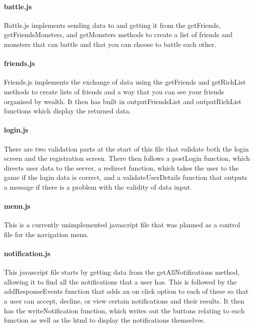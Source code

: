 \documentclass{project}
\begin{document}
\paragraph{battle.js}
Battle.js implements sending data to and getting it from the getFriends, getFriendsMonsters, and getMonsters methods to create a list of friends and monsters that can battle and that you can choose to battle each other.

\paragraph{friends.js}
Friends.js implements the exchange of data using the getFriends and getRichList methods to create lists of friends and a way that you can see your friends organised by wealth. It then has built in outputFriendsList and outputRichList functions which display the returned data.

\paragraph{login.js}
There are two validation parts at the start of this file that validate both the login screen and the registration screen. There then follows a postLogin function, which directs user data to the server, a redirect function, which takes the user to the game if the login data is correct, and a validateUserDetails function that outputs a message if there is a problem with the validity of data input.

\paragraph{menu.js}
This is a currently unimplemented javascript file that was planned as a control file for the navigation menu.

\paragraph{notification.js}
This javascript file starts by getting data from the getAllNotifications method, allowing it to find all the notifications that a user has. This is followed by the addResponseEvents function that adds an on click option to each of these so that a user can accept, decline, or view certain notifications and their results. It then has the writeNotification function, which writes out the buttons relating to each function as well as the html to display the notifications themselves.
\end{document}
